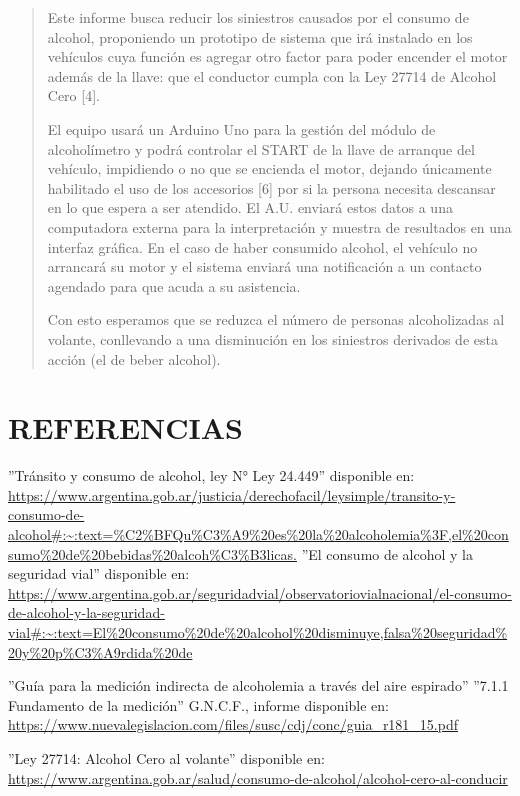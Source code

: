 \documentclass[a4paper,11pt]{article}
\begin{document}
\begin{multicols}{2}
\begin{quotation}
			Este informe busca reducir los siniestros causados por el consumo de alcohol, proponiendo un prototipo de sistema que irá instalado en los vehículos cuya función es agregar otro factor para poder encender el motor además de la llave: que el conductor cumpla con la Ley 27714 de Alcohol Cero [4].
			
			El equipo usará un Arduino Uno para la gestión del módulo de alcoholímetro y podrá controlar el START de la llave de arranque del vehículo, impidiendo o no que se encienda el motor, dejando únicamente habilitado el uso de los accesorios [6] por si la persona necesita descansar en lo que espera a ser atendido. El A.U. enviará estos datos a una computadora externa para la interpretación y muestra de resultados en una interfaz gráfica. En el caso de haber consumido alcohol, el vehículo no arrancará su motor y el sistema enviará una notificación a un contacto agendado para que acuda a su asistencia.
			
			Con esto esperamos que se reduzca el número de personas alcoholizadas al volante, conllevando a una disminución en los siniestros derivados de esta acción (el de beber alcohol).
		\end{quotation}
		
		\section{REFERENCIAS}
		\vspace{-1cm}
		\begin{thebibliography}{6}
			''Tránsito y consumo de alcohol, ley N° Ley 24.449'' disponible en: \url{https://www.argentina.gob.ar/justicia/derechofacil/leysimple/transito-y-consumo-de-alcohol#:~:text=%C2%BFQu%C3%A9%20es%20la%20alcoholemia%3F,el%20consumo%20de%20bebidas%20alcoh%C3%B3licas.}			
			''El consumo de alcohol y la seguridad vial'' disponible en: \url{https://www.argentina.gob.ar/seguridadvial/observatoriovialnacional/el-consumo-de-alcohol-y-la-seguridad-vial#:~:text=El%20consumo%20de%20alcohol%20disminuye,falsa%20seguridad%20y%20p%C3%A9rdida%20de}
			
			''Guía para la medición indirecta de alcoholemia a través del aire espirado'' ''7.1.1 Fundamento de la medición'' G.N.C.F., informe disponible en: \url{https://www.nuevalegislacion.com/files/susc/cdj/conc/guia_r181_15.pdf}
			
			''Ley 27714: Alcohol Cero al volante'' disponible en: \url{https://www.argentina.gob.ar/salud/consumo-de-alcohol/alcohol-cero-al-conducir}
			

\end{thebibliography}
\end{multicols}
\end{document}
